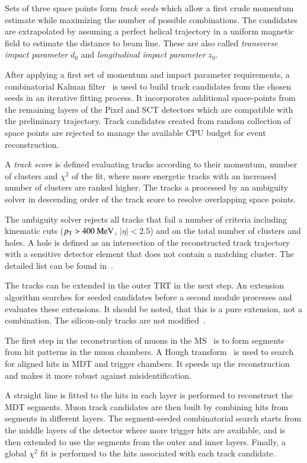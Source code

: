 Sets of three space points form \textit{track seeds} which allow a first crude momentum estimate while maximizing the number of possible combinations.
The candidates are extrapolated by assuming a perfect helical
trajectory in a uniform magnetic field to estimate the distance to beam line. These are also called \textit{transverse impact parameter} $d_0$ and \textit{longitudinal impact parameter} $z_0$.

After applying a first set of momentum and impact parameter requirements, 
a combinatorial Kalman filter~\cite{FRUHWIRTH1987444} is used to
build track candidates from the chosen seeds in an iterative fitting process.
It incorporates additional space-points from the remaining
layers of the Pixel and SCT detectors which are compatible with the preliminary trajectory.
Track candidates created from random collection of space points are rejected to manage the available CPU budget for event reconstruction.

A \textit{track score} is defined evaluating tracks according to their momentum, number of clusters and $\chi^2$ of the fit, where more energetic tracks with an increased number of clusters are ranked higher.
The tracks a processed by an ambiguity solver in descending order of the track score to resolve overlapping space points.

The ambiguity solver rejects all tracks that fail a number of criteria
including kinematic cuts ($p_{\text{T}} > 400 ~\text{MeV}$, $|\eta|<2.5$) and on the total 
number of clusters and holes. A hole is defined as an intersection of the reconstructed track trajectory with a sensitive detector element that does not contain a matching cluster. The detailed list can be found in~\cite{PERF-2015-08}.

The tracks can be extended in the outer TRT in the next step.
An extension algorithm searches for seeded candidates before a second module
processes and evaluates these extensions.
It should be noted, that this is a pure extension, not a combination.
The silicon-only tracks are not modified~\cite{Cornelissen_2008}.

The first step in the reconstruction of muons in the MS~\cite{PERF-2015-10} is to form segments from hit patterns in the muon chambers.
A Hough transform~\cite{ILLINGWORTH198887} is used to search for aligned hits in MDT and trigger chambers.
It speeds up the reconstruction and makes it more robust against misidentification.

A straight line is fitted to the hits in each layer is performed to reconstruct the MDT segments.
Muon track candidates are then built by combining hits from segments in different layers. 
The segment-seeded combinatorial search starts from the middle
layers of the detector where more trigger hits are available,
and is then extended to use the segments from the outer and inner layers.
Finally, a global $\chi^2$ fit is performed to
the hits associated with each track candidate.


